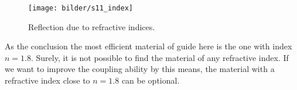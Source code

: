 \begin{figure}[!ht]
\centering
\texttt{[image: bilder/s11\_index]}
\caption{Reflection due to refractive indices.}
\label{fig:s11_index}
\end{figure}

As the conclusion the most efficient material of guide here is the one with index $n=1.8$.  Surely, it is not possible to find the material of any refractive index. If we want to improve the coupling ability by this means, the material with a refractive index close to $n=1.8$ can be optional.
